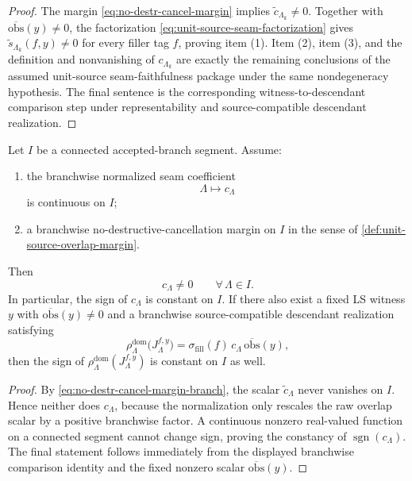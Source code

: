 \begin{proof}
The margin \eqref{eq:no-destr-cancel-margin} implies
\(
\widetilde c_{\Lambda_k}\neq 0
\).
Together with
\(
\overline{\mathrm{obs}}(y)\neq 0
\),
the factorization \eqref{eq:unit-source-seam-factorization} gives
\(
\widetilde s_{\Lambda_k}(f,y)\neq 0
\)
for every filler tag \(f\), proving item (1).
Item (2), item (3), and the definition and nonvanishing of
\(
c_{\Lambda_k}
\)
are exactly the remaining conclusions of the assumed unit-source seam-faithfulness package under the
same nondegeneracy hypothesis.
The final sentence is the corresponding witness-to-descendant comparison step under representability
and source-compatible descendant realization.
\end{proof}

\begin{corollary}
\label{cor:branchwise-c-nondegeneracy}
Let \(I\) be a connected accepted-branch segment.
Assume:
\begin{enumerate}[leftmargin=2em]
\item the branchwise normalized seam coefficient
  \[
  \Lambda\mapsto c_{\Lambda}
  \]
  is continuous on \(I\);
\item a branchwise no-destructive-cancellation margin on \(I\) in the sense of
  \cref{def:unit-source-overlap-margin}.
\end{enumerate}
Then
\[
c_{\Lambda}\neq 0
\qquad
\forall\,\Lambda\in I.
\]
In particular, the sign of \(c_{\Lambda}\) is constant on \(I\).
If there also exist a fixed LS witness \(y\) with
\(
\overline{\mathrm{obs}}(y)\neq 0
\)
and a branchwise source-compatible descendant realization satisfying
\[
\rho^{\mathrm{dom}}_{\Lambda}\!\big(J^{f,y}_{\Lambda}\big)
=
\sigma_{\mathrm{fill}}(f)\,
c_{\Lambda}\,
\overline{\mathrm{obs}}(y),
\]
then the sign of
\(
\rho^{\mathrm{dom}}_{\Lambda}(J^{f,y}_{\Lambda})
\)
is constant on \(I\) as well.
\end{corollary}

\begin{proof}
By \eqref{eq:no-destr-cancel-margin-branch}, the scalar
\(
\widetilde c_{\Lambda}
\)
never vanishes on \(I\).
Hence neither does
\(
c_{\Lambda}
\),
because the normalization only rescales the raw overlap scalar by a positive branchwise factor.
A continuous nonzero real-valued function on a connected segment cannot change sign, proving the
constancy of \(\operatorname{sgn}(c_{\Lambda})\).
The final statement follows immediately from the displayed branchwise comparison identity and the
fixed nonzero scalar \(\overline{\mathrm{obs}}(y)\).
\end{proof}


